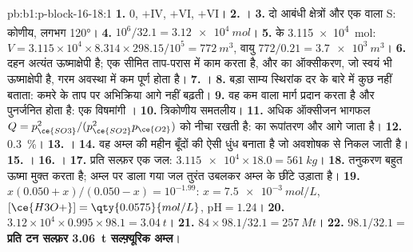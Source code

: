 \begin{solution}{pb:b1:p-block-16-18:1}
\textbf{1.} 0, $+$IV, $+$VI, $+$VI।
\textbf{2.} ।
\textbf{3.} दो आबंधी क्षेत्रों और एक  वाला S: कोणीय, लगभग
\ang{120}।
\textbf{4.} $10^6/32.1 = \qty{3.12e4}{mol}$।
\textbf{5.}  के \qty{3.115e4}{mol}: $V = 3.115 \times 10^4 \times
8.314 \times 298.15/10^5 = \qty{772}{m^3}$, वायु $772/0.21 = \qty{3.7e3}{m^3}$।
\textbf{6.} दहन अत्यंत ऊष्माक्षेपी है;  एक सीमित ताप-परास में
काम करता है, और  का ऑक्सीकरण, जो स्वयं भी
ऊष्माक्षेपी है, गरम अवस्था में कम पूर्ण होता है।
\textbf{7.} ।
\textbf{8.} बड़ा साम्य स्थिरांक दर के बारे में कुछ नहीं बताता:
कमरे के ताप पर अभिक्रिया आगे नहीं बढ़ती।
\textbf{9.} वह कम  वाला मार्ग प्रदान करता है और
पुनर्जनित होता है: एक विषमांगी ।
\textbf{10.} त्रिकोणीय समतलीय।
\textbf{11.} अधिक ऑक्सीजन भागफल
$Q = p_{\ce{SO3}}^2/(p_{\ce{SO2}}^2 p_{\ce{O2}})$ को नीचा रखती है:  का
रूपांतरण और आगे जाता है।
\textbf{12.} \qty{0.3}{\percent}।
\textbf{13.} ।
\textbf{14.} वह अम्ल की महीन बूँदों की ऐसी धुंध बनाता है जो
अवशोषक से निकल जाती है।
\textbf{15.} ।
\textbf{16.} ।
\textbf{17.} प्रति सल्फ़र एक जल: $\num{3.115e4} \times 18.0 =
\qty{561}{kg}$।
\textbf{18.} तनुकरण बहुत ऊष्मा मुक्त करता है; अम्ल पर डाला गया जल
तुरंत उबलकर अम्ल के छींटे उड़ाता है।
\textbf{19.} $x(0.050 + x)/(0.050 - x) = 10^{-1.99}$: $x = \qty{7.5e-3}{mol/L}$,
$[\ce{H3O+}] = \qty{0.0575}{mol/L}$, $\mathrm{pH} = 1.24$।
\textbf{20.} $3.12 \times 10^4 \times 0.995 \times 98.1 = \qty{3.04}{t}$।
\textbf{21.} $84 \times 98.1/32.1 = \qty{257}{Mt}$।
\textbf{22.} $98.1/32.1 =$ \textbf{प्रति टन सल्फ़र \qty{3.06}{t} सल्फ़्यूरिक
अम्ल}।
\end{solution}
